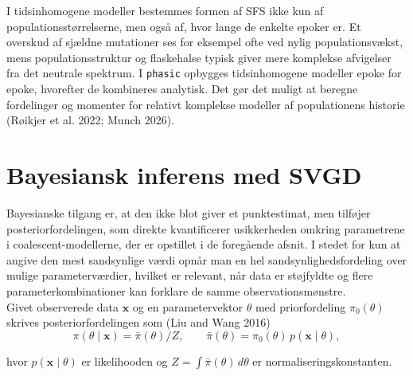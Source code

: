 \documentclass[
  10pt,
  a4paper,
]{scrbook}
\begin{document}
I tidsinhomogene modeller bestemmes formen af SFS ikke kun af
populationsstørrelserne, men også af, hvor lange de enkelte epoker er.
Et overskud af sjældne mutationer ses for eksempel ofte ved nylig
populationsvækst, mens populationsstruktur og flaskehalse typisk giver
mere komplekse afvigelser fra det neutrale spektrum. I \texttt{phasic}
opbygges tidsinhomogene modeller epoke for epoke, hvorefter de
kombineres analytisk. Det gør det muligt at beregne fordelinger og
momenter for relativt komplekse modeller af populationens historie
(Røikjer et al. 2022; Munch 2026).

\section{Bayesiansk inferens med
SVGD}\label{bayesiansk-inferens-med-svgd}

Bayesianske tilgang er, at den ikke blot giver et punktestimat, men
tilføjer posteriorfordelingen, som direkte kvantificerer usikkerheden
omkring parametrene i coalescent-modellerne, der er opstillet i de
foregående afsnit. I stedet for kun at angive den mest sandsynlige værdi
opnår man en hel sandsynlighedsfordeling over mulige parameterværdier,
hvilket er relevant, når data er støjfyldte og flere
parameterkombinationer kan forklare de samme observationsmønstre.\\
Givet observerede data \(\mathbf{x}\) og en parametervektor \(\theta\)
med priorfordeling \(\pi_0(\theta)\) skrives posteriorfordelingen som
(Liu and Wang 2016) \[
\pi(\theta \mid \mathbf{x}) = \bar\pi(\theta)/Z, \qquad \bar\pi(\theta) = \pi_0(\theta)\,p(\mathbf{x}\mid\theta),
\]

hvor \(p(\mathbf{x}\mid\theta)\) er likelihooden og
\(Z=\int\bar\pi(\theta)\,d\theta\) er normaliseringskonstanten.
\end{document}

